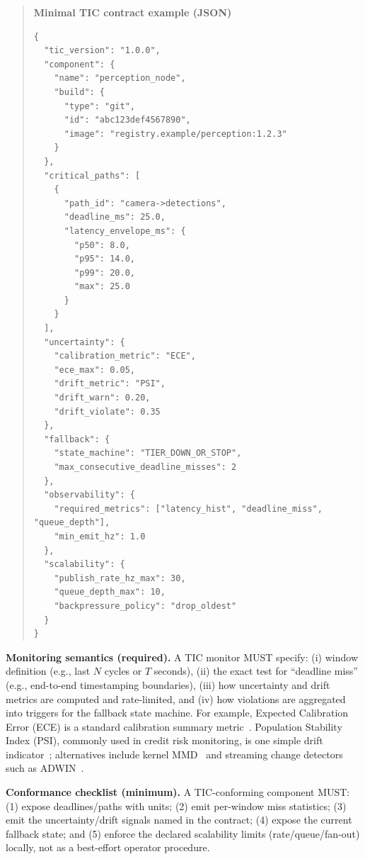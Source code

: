 \documentclass[smallextended]{svjour3}
\newenvironment{designbox}[1]{%
  \begin{quote}\small\noindent\textbf{#1}\par\smallskip%
}{\end{quote}}
\begin{document}
\begin{designbox}{Minimal TIC contract example (JSON)}
\begin{verbatim}
{
  "tic_version": "1.0.0",
  "component": {
    "name": "perception_node",
    "build": {
      "type": "git",
      "id": "abc123def4567890",
      "image": "registry.example/perception:1.2.3"
    }
  },
  "critical_paths": [
    {
      "path_id": "camera->detections",
      "deadline_ms": 25.0,
      "latency_envelope_ms": {
        "p50": 8.0,
        "p95": 14.0,
        "p99": 20.0,
        "max": 25.0
      }
    }
  ],
  "uncertainty": {
    "calibration_metric": "ECE",
    "ece_max": 0.05,
    "drift_metric": "PSI",
    "drift_warn": 0.20,
    "drift_violate": 0.35
  },
  "fallback": {
    "state_machine": "TIER_DOWN_OR_STOP",
    "max_consecutive_deadline_misses": 2
  },
  "observability": {
    "required_metrics": ["latency_hist", "deadline_miss", "queue_depth"],
    "min_emit_hz": 1.0
  },
  "scalability": {
    "publish_rate_hz_max": 30,
    "queue_depth_max": 10,
    "backpressure_policy": "drop_oldest"
  }
}
\end{verbatim}
\end{designbox}

\noindent\textbf{Monitoring semantics (required).} A TIC monitor MUST specify: (i)
window definition (e.g., last $N$ cycles or $T$ seconds), (ii) the exact test for
``deadline miss'' (e.g., end-to-end timestamping boundaries), (iii) how uncertainty
and drift metrics are computed and rate-limited, and (iv) how violations are
aggregated into triggers for the fallback state machine. For example, Expected
Calibration Error (ECE) is a standard calibration summary metric~\cite{guo2017calibration}.
Population Stability Index (PSI), commonly used in credit risk monitoring, is one
simple drift indicator~\cite{siddiqi2005scorecards}; alternatives include kernel MMD~\cite{gretton2012kernel}
and streaming change detectors such as ADWIN~\cite{bifet2007adwin}.

\noindent\textbf{Conformance checklist (minimum).} A TIC-conforming component MUST:
(1) expose deadlines/paths with units; (2) emit per-window miss statistics; (3)
emit the uncertainty/drift signals named in the contract; (4) expose the current
fallback state; and (5) enforce the declared scalability limits (rate/queue/fan-out)
locally, not as a best-effort operator procedure.
\end{document}
